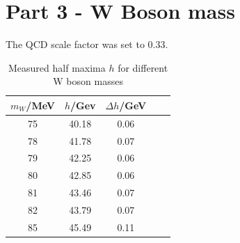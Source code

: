 \section{Part 3 - W Boson mass}

The QCD scale factor was set to $0.33$.

\begin{table}
\centering
\caption{Measured half maxima $h$ for different W boson masses}
\begin{tabular}{ccccc}
\toprule
$m_W$/MeV & $h$/Gev & $\Delta h$/GeV\\ 
\midrule
75&	40.18&	0.06\\
78&	41.78&	0.07\\
79&	42.25&	0.06\\
80&	42.85&	0.06\\
81&	43.46&	0.07\\
82&	43.79&	0.07\\
85&	45.49&	0.11\\
\bottomrule
\end{tabular}
\label{tab:task3_33}
\end{table}